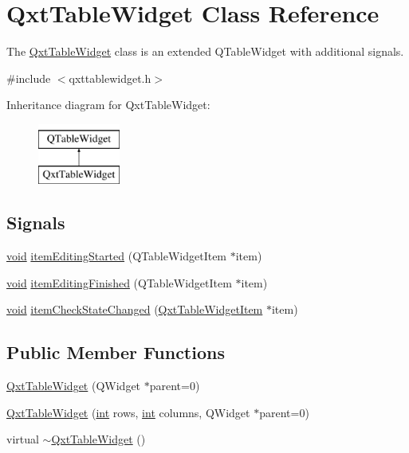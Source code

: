 \hypertarget{class_qxt_table_widget}{\section{Qxt\-Table\-Widget Class Reference}
\label{class_qxt_table_widget}
}


The \hyperlink{class_qxt_table_widget}{Qxt\-Table\-Widget} class is an extended Q\-Table\-Widget with additional signals.  




{\ttfamily \#include $<$qxttablewidget.\-h$>$}

Inheritance diagram for Qxt\-Table\-Widget\-:\begin{figure}[H]
\begin{center}
\leavevmode
\includegraphics[height=2.000000cm]{class_qxt_table_widget}
\end{center}
\end{figure}
\subsection*{Signals}
\begin{DoxyCompactItemize}
\item 
\hyperlink{group___u_a_v_objects_plugin_ga444cf2ff3f0ecbe028adce838d373f5c}{void} \hyperlink{class_qxt_table_widget_a196ac7e06d1b525647132ff3e747aa3d}{item\-Editing\-Started} (Q\-Table\-Widget\-Item $\ast$item)
\item 
\hyperlink{group___u_a_v_objects_plugin_ga444cf2ff3f0ecbe028adce838d373f5c}{void} \hyperlink{class_qxt_table_widget_af6be318df1d9d94e18bd5acffdc33ebd}{item\-Editing\-Finished} (Q\-Table\-Widget\-Item $\ast$item)
\item 
\hyperlink{group___u_a_v_objects_plugin_ga444cf2ff3f0ecbe028adce838d373f5c}{void} \hyperlink{class_qxt_table_widget_a6fca4e12204367ed2a3f62aafc8b1b90}{item\-Check\-State\-Changed} (\hyperlink{class_qxt_table_widget_item}{Qxt\-Table\-Widget\-Item} $\ast$item)
\end{DoxyCompactItemize}
\subsection*{Public Member Functions}
\begin{DoxyCompactItemize}
\item 
\hyperlink{class_qxt_table_widget_a4297bb256925b16b400ef2e27a7b3f17}{Qxt\-Table\-Widget} (Q\-Widget $\ast$parent=0)
\item 
\hyperlink{class_qxt_table_widget_a58437ed169a8aea4bdf1da66eba3f9e6}{Qxt\-Table\-Widget} (\hyperlink{ioapi_8h_a787fa3cf048117ba7123753c1e74fcd6}{int} rows, \hyperlink{ioapi_8h_a787fa3cf048117ba7123753c1e74fcd6}{int} columns, Q\-Widget $\ast$parent=0)
\item 
virtual \hyperlink{class_qxt_table_widget_a08c7263211c40ae50cec93c8f0b2fe99}{$\sim$\-Qxt\-Table\-Widget} ()
\end{DoxyCompactItemize}



